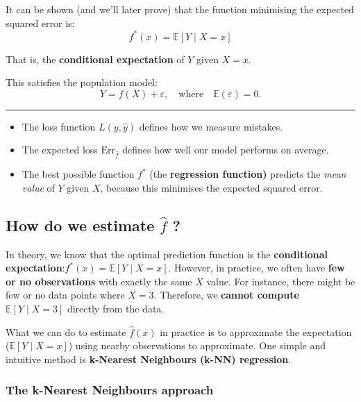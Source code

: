 \documentclass[
  letterpaper,
  DIV=11,
  numbers=noendperiod]{scrartcl}
\providecommand{\tightlist}{%
  \setlength{\itemsep}{0pt}\setlength{\parskip}{0pt}}\usepackage{longtable,booktabs,array}
\begin{document}
It can be shown (and we'll later prove) that the function minimising the
expected squared error is: \[ f^*(x) = \mathbb{E}[Y \mid X = x] \]

That is, the \textbf{conditional expectation} of \(Y\) given \(X = x\).

This satisfies the population model:
\[ Y = f(X) + \varepsilon, \quad \text{where} \quad \mathbb{E}(\varepsilon) = 0. \]

\begin{center}\rule{0.5\linewidth}{0.5pt}\end{center}

\begin{itemize}
\tightlist
\item
  The loss function \(L(y, \hat{y})\) defines how we measure mistakes.
\item
  The expected loss \(\text{Err}_{\hat{f}}\) defines how well our model
  performs on average.
\item
  The best possible function \(f^*\) (the \textbf{regression function)}
  predicts the \emph{mean value} of \(Y\) given \(X\), because this
  minimises the expected squared error.
\end{itemize}

\subsection{\texorpdfstring{How do we estimate \(\hat{f}\)
?}{How do we estimate \textbackslash hat\{f\} ?}}\label{how-do-we-estimate-hatf}

In theory, we know that the optimal prediction function is the
\textbf{conditional expectation}:\(f^*(x) = \mathbb{E}[Y \mid X = x]\).
However, in practice, we often have \textbf{few or no observations} with
exactly the same \(X\) value. For instance, there might be few or no
data points where \(X = 3\). Therefore, we \textbf{cannot compute}
\(\mathbb{E}[Y \mid X = 3]\) directly from the data.

What we can do to estimate \(\hat{f}(x)\) in practice is to approximate
the expectation (\(\mathbb{E}[Y \mid X = x]\)) using nearby observations
to approximate. One simple and intuitive method is \textbf{k-Nearest
Neighbours (k-NN) regression}.

\subsubsection{The k-Nearest Neighbours
approach}\label{the-k-nearest-neighbours-approach}
\end{document}
